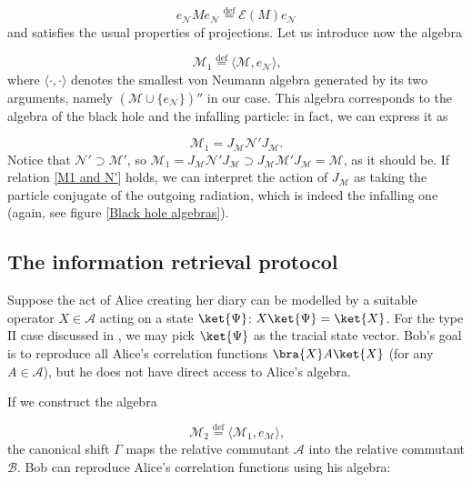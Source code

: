 \documentclass[a4paper,11pt]{article}
\newcommand{\eqdef}{\overset{\mathrm{def}}{=}}
\begin{document}
\begin{equation}
    e_{\mathcal{N}} M e_{\mathcal{N}} \eqdef \mathcal{E}(M) e_{\mathcal{N}}
\end{equation}
%
and satisfies the usual properties of projections. Let us introduce now the algebra

\begin{equation}
    \mathcal{M}_1 \eqdef \langle \mathcal{M}, e_{\mathcal{N}} \rangle \text{,}
\end{equation}
%
where $\langle \cdot, \cdot \rangle$ denotes the smallest von Neumann algebra generated by its two arguments, namely $( \mathcal{M} \cup \{ e_{\mathcal{N}} \} )''$ in our case. This algebra corresponds to the algebra of the black hole and the infalling particle: in fact, we can express it as

\begin{equation}
    \mathcal{M}_1 = J_{\mathcal{M}} \mathcal{N}' J_{\mathcal{M}} \text{.}
    \label{M1 and N'}
\end{equation}
%
Notice that $\mathcal{N}' \supset \mathcal{M}'$, so $\mathcal{M}_1 = J_{\mathcal{M}} \mathcal{N}' J_{\mathcal{M}} \supset J_{\mathcal{M}} \mathcal{M}' J_{\mathcal{M}} = \mathcal{M}$, as it should be. If relation \ref{M1 and N'} holds, we can interpret the action of $J_{\mathcal{M}}$ as taking the particle conjugate of the outgoing radiation, which is indeed the infalling one (again, see figure \ref{Black hole algebras}).

\subsection{The information retrieval protocol}

Suppose the act of Alice creating her diary can be modelled by a suitable operator $X \in \mathcal{A}$ acting on a state $\ket{\Psi}$: $X \ket{\Psi} = \ket{X}$. For the type $\mathrm{II}$ case discussed in \cite{Verlinde}, we may pick $\ket{\Psi}$ as the tracial state vector. Bob's goal is to reproduce all Alice's correlation functions $\bra{X} A \ket{X}$ (for any $A \in \mathcal{A}$), but he does not have direct access to Alice's algebra. 

If we construct the algebra

\begin{equation}
    \mathcal{M}_2 \eqdef \langle \mathcal{M}_1, e_{\mathcal{M}} \rangle \text{,}
\end{equation}
%
the canonical shift $\Gamma$ maps the relative commutant $\mathcal{A}$ into the relative commutant $\mathcal{B}$. Bob can reproduce Alice's correlation functions using his algebra:
\end{document}
